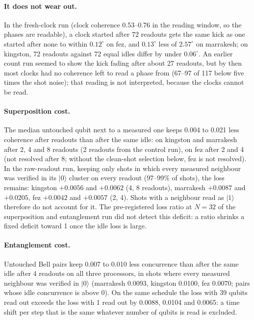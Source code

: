 \documentclass[reprint,amsmath,amssymb,aps,superscriptaddress,nofootinbib]{revtex4-2}
\begin{document}
\paragraph*{It does not wear out.} In the fresh-clock run (clock coherence 0.53--0.76 in the reading window, so the phases are readable), a clock started after 72 readouts gets the same kick as one started after none to within $0.12^\circ$ on fez, and $0.13^\circ$ less of $2.57^\circ$ on marrakesh; on kingston, 72 readouts against 72 equal idles differ by under $0.06^\circ$. An earlier count run seemed to show the kick fading after about 27 readouts, but by then most clocks had no coherence left to read a phase from (67--97 of 117 below five times the shot noise); that reading is not interpreted, because the clocks cannot be read.

\paragraph*{Superposition cost.} The median untouched qubit next to a measured one keeps 0.004 to 0.021 less coherence after readouts than after the same idle: on kingston and marrakesh after 2, 4 and 8 readouts (2 readouts from the control run), on fez after 2 and 4 (not resolved after 8; without the clean-shot selection below, fez is not resolved). In the raw-readout run, keeping only shots in which every measured neighbour was verified in its $|0\rangle$ cluster on every readout (97--99\% of shots), the loss remains: kingston $+0.0056$ and $+0.0062$ (4, 8 readouts), marrakesh $+0.0087$ and $+0.0205$, fez $+0.0042$ and $+0.0057$ (2, 4). Shots with a neighbour read as $|1\rangle$ therefore do not account for it. The pre-registered loss ratio at $N=32$ of the superposition and entanglement run did not detect this deficit: a ratio shrinks a fixed deficit toward 1 once the idle loss is large.

\paragraph*{Entanglement cost.} Untouched Bell pairs keep 0.007 to 0.010 less concurrence than after the same idle after 4 readouts on all three processors, in shots where every measured neighbour was verified in $|0\rangle$ (marrakesh 0.0093, kingston 0.0100, fez 0.0070; pairs whose idle concurrence is above 0). On the same schedule the loss with 39 qubits read out exceeds the loss with 1 read out by 0.0088, 0.0104 and 0.0065: a time shift per step that is the same whatever number of qubits is read is excluded.
\end{document}
